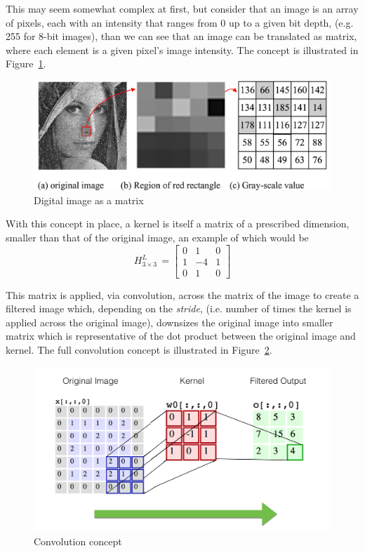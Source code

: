 \documentclass[letterpaper,12pt]{article}
\newcommand{\figref}[1]{Figure~\ref{#1}}
\begin{document}
This may seem somewhat complex at first, but consider that an image is an array of pixels, each with an intensity that ranges from 0 up to a given bit depth, (e.g. 255 for 8-bit images), than we can see that an image can be translated as matrix, where each element is a given pixel's image intensity. The concept is illustrated in \figref{lena}.
\begin{figure}[htbp]
\begin{center}
\includegraphics[scale=0.1]{images/lena.png}
\caption{Digital image as a matrix \cite{lena}}
\label{lena}
\end{center}
\end{figure}

With this concept in place, a kernel is itself a matrix of a prescribed dimension, smaller than that of the original image,  an example of which would be
\begin{equation}
H_{3 \times 3}^L \, = 
\begin{bmatrix}
  0 & 1  & 0 \\
  1 & -4 & 1 \\
  0 & 1  & 0
\end{bmatrix}
\label{lap_3x3}
\end{equation}

This matrix is applied, via convolution, across the matrix of the image to create a filtered image which, depending on the \textit{stride}, (i.e. number of times the kernel is applied across the original image), downsizes the original image into smaller matrix which is representative of the dot product between the original image and kernel.  The full convolution concept is illustrated in \figref{conv}. 

\begin{figure}[htbp]
\begin{center}
\includegraphics[scale=0.7]{images/convolution.png}
\caption{Convolution concept \cite{cs231}}
\label{conv}
\end{center}
\end{figure}
\end{document}
